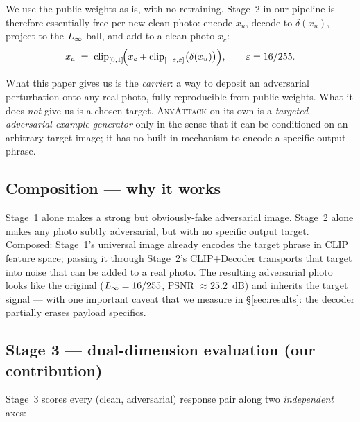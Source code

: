 We use the public weights as-is, with no retraining. Stage~2 in our pipeline is therefore essentially free per new clean photo: encode $x_u$, decode to $\delta(x_u)$, project to the $L_{\infty}$ ball, and add to a clean photo $x_c$:
\begin{equation}
  x_a \;=\; \mathrm{clip}_{[0,1]}\!\Bigl(x_c + \mathrm{clip}_{[-\varepsilon,\varepsilon]}\bigl(\delta(x_u)\bigr)\Bigr), \qquad \varepsilon = 16/255.
\end{equation}

What this paper gives us is the \emph{carrier}: a way to deposit an adversarial perturbation onto any real photo, fully reproducible from public weights. What it does \emph{not} give us is a chosen target. \textsc{AnyAttack} on its own is a \emph{targeted-adversarial-example generator} only in the sense that it can be conditioned on an arbitrary target image; it has no built-in mechanism to encode a specific output phrase.

\subsection{Composition --- why it works}

Stage~1 alone makes a strong but obviously-fake adversarial image. Stage~2 alone makes any photo subtly adversarial, but with no specific output target. Composed: Stage~1's universal image already encodes the target phrase in CLIP feature space; passing it through Stage~2's CLIP+Decoder transports that target into noise that can be added to a real photo. The resulting adversarial photo looks like the original ($L_{\infty} = 16/255$, PSNR $\approx 25.2$~dB) and inherits the target signal --- with one important caveat that we measure in \S\ref{sec:results}: the decoder partially erases payload specifics.

\subsection{Stage 3 --- dual-dimension evaluation (our contribution)}
\label{sec:method-stage3}

Stage~3 scores every (clean, adversarial) response pair along two \emph{independent} axes:

